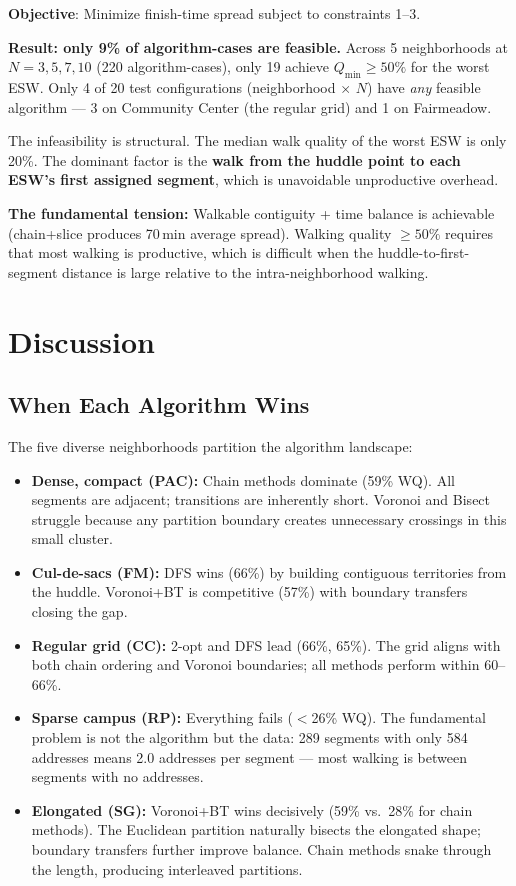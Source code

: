 \documentclass[conference]{IEEEtran}
\begin{document}
\textbf{Objective}: Minimize finish-time spread subject to constraints 1--3.

\textbf{Result: only 9\% of algorithm-cases are feasible.} Across 5 neighborhoods at $N = 3, 5, 7, 10$ (220 algorithm-cases), only 19 achieve $Q_{\min} \geq 50\%$ for the worst ESW. Only 4 of 20 test configurations (neighborhood $\times$ $N$) have \emph{any} feasible algorithm --- 3 on Community Center (the regular grid) and 1 on Fairmeadow.

The infeasibility is structural. The median walk quality of the worst ESW is only 20\%. The dominant factor is the \textbf{walk from the huddle point to each ESW's first assigned segment}, which is unavoidable unproductive overhead.

\textbf{The fundamental tension:} Walkable contiguity + time balance is achievable (chain+slice produces 70\,min average spread). Walking quality $\geq 50\%$ requires that most walking is productive, which is difficult when the huddle-to-first-segment distance is large relative to the intra-neighborhood walking.

\section{Discussion}
\label{sec:discussion}

\subsection{When Each Algorithm Wins}

The five diverse neighborhoods partition the algorithm landscape:

\begin{itemize}
\item \textbf{Dense, compact (PAC):} Chain methods dominate (59\% WQ). All segments are adjacent; transitions are inherently short. Voronoi and Bisect struggle because any partition boundary creates unnecessary crossings in this small cluster.
\item \textbf{Cul-de-sacs (FM):} DFS wins (66\%) by building contiguous territories from the huddle. Voronoi+BT is competitive (57\%) with boundary transfers closing the gap.
\item \textbf{Regular grid (CC):} 2-opt and DFS lead (66\%, 65\%). The grid aligns with both chain ordering and Voronoi boundaries; all methods perform within 60--66\%.
\item \textbf{Sparse campus (RP):} Everything fails ($<$26\% WQ). The fundamental problem is not the algorithm but the data: 289 segments with only 584 addresses means 2.0 addresses per segment --- most walking is between segments with no addresses.
\item \textbf{Elongated (SG):} Voronoi+BT wins decisively (59\% vs.\ 28\% for chain methods). The Euclidean partition naturally bisects the elongated shape; boundary transfers further improve balance. Chain methods snake through the length, producing interleaved partitions.
\end{itemize}
\end{document}
